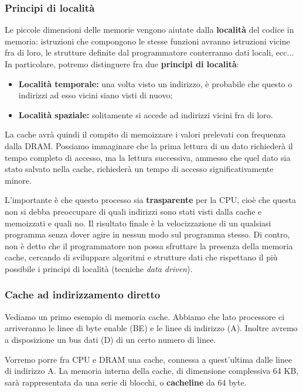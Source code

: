 \documentclass[a4paper,11pt]{article}
\begin{document}
\subsubsection{Principi di località}
Le piccole dimensioni delle memorie vengono aiutate dalla \textbf{località} del codice in memoria: istruzioni che compongono le stesse funzioni avranno istruzioni vicine fra di loro, le strutture definite dal programmatore conterranno dati locali, ecc...
In particolare, potremo distinguere fra due \textbf{principi di località}:
\begin{itemize}
	\item \textbf{Località temporale:} una volta visto un indirizzo, è probabile che questo o indirizzi ad esso vicini siano visti di nuovo;
	\item \textbf{Località spaziale:} solitamente si accede ad indirizzi vicini fra di loro.
\end{itemize}

\par\smallskip

La cache avrà quindi il compito di memoizzare i valori prelevati con frequenza dalla DRAM.
Possiamo immaginare che la prima lettura di un dato richiederà il tempo completo di accesso, ma la lettura successiva, ammesso che quel dato sia stato salvato nella cache, richiederà un tempo di accesso significativamente minore.

L'importante è che questo processo sia \textbf{trasparente} per la CPU, cioè che questa non si debba preoccupare di quali indirizzi sono stati visti dalla cache e memoizzati e quali no.
Il risultato finale è la velocizzazione di un qualsiasi programma senza dover agire in nessun modo sul programma stesso.
Di contro, non è detto che il programmatore non possa sfruttare la presenza della memoria cache, cercando di sviluppare algoritmi e strutture dati che rispettano il più possibile i principi di località (tecniche \textit{data driven}).

\subsubsection{Cache ad indirizzamento diretto}
Vediamo un primo esempio di memoria cache.
Abbiamo che lato processore ci arriveranno le linee di byte enable (BE) e le linee di indirizzo (A).
Inoltre avremo a disposizione un bus dati (D) di un certo numero di linee.

Vorremo porre fra CPU e DRAM una cache, connessa a quest'ultima dalle linee di indirizzo A.
La memoria interna della cache, di dimensione complessiva 64 KB, sarà rappresentata da una serie di blocchi, o \textbf{cacheline} da 64 byte.
\end{document}
